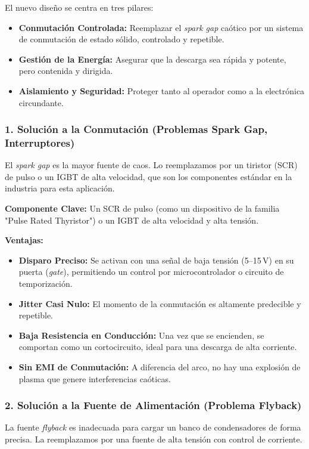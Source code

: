 \documentclass[12pt,a4paper]{article}
\begin{document}
El nuevo diseño se centra en tres pilares:
\begin{itemize}
    \item \textbf{Conmutación Controlada:} Reemplazar el \textit{spark gap} caótico por un sistema de conmutación de estado sólido, controlado y repetible.
    \item \textbf{Gestión de la Energía:} Asegurar que la descarga sea rápida y potente, pero contenida y dirigida.
    \item \textbf{Aislamiento y Seguridad:} Proteger tanto al operador como a la electrónica circundante.
\end{itemize}

\subsubsection{1. Solución a la Conmutación (Problemas Spark Gap, Interruptores)}
El \textit{spark gap} es la mayor fuente de caos. Lo reemplazamos por un tiristor (SCR) de pulso o un IGBT de alta velocidad, que son los componentes estándar en la industria para esta aplicación.

\textbf{Componente Clave:} Un SCR de pulso (como un dispositivo de la familia "Pulse Rated Thyristor") o un IGBT de alta velocidad y alta tensión.

\textbf{Ventajas:}
\begin{itemize}
    \item \textbf{Disparo Preciso:} Se activan con una señal de baja tensión (5--15\,V) en su puerta (\textit{gate}), permitiendo un control por microcontrolador o circuito de temporización.
    \item \textbf{Jitter Casi Nulo:} El momento de la conmutación es altamente predecible y repetible.
    \item \textbf{Baja Resistencia en Conducción:} Una vez que se encienden, se comportan como un cortocircuito, ideal para una descarga de alta corriente.
    \item \textbf{Sin EMI de Conmutación:} A diferencia del arco, no hay una explosión de plasma que genere interferencias caóticas.
\end{itemize}

\subsubsection{2. Solución a la Fuente de Alimentación (Problema Flyback)}
La fuente \textit{flyback} es inadecuada para cargar un banco de condensadores de forma precisa. La reemplazamos por una fuente de alta tensión con control de corriente.
\end{document}
